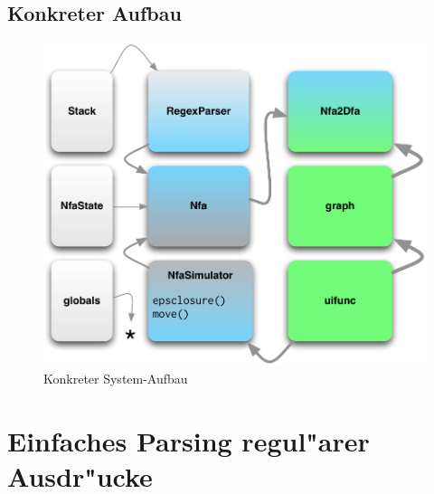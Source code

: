 \documentclass[ignorenonframetext]{beamer}
\begin{document}
\subsection{Konkreter Aufbau}
\begin{frame}[plain]
    
    \begin{center}
        \begin{figure}
            \includegraphics[scale=0.65]{a1.pdf}
            \caption{Konkreter System-Aufbau}
        \end{figure}
    \end{center}
\end{frame}




\section{Einfaches Parsing regul"arer Ausdr"ucke}
\end{document}

